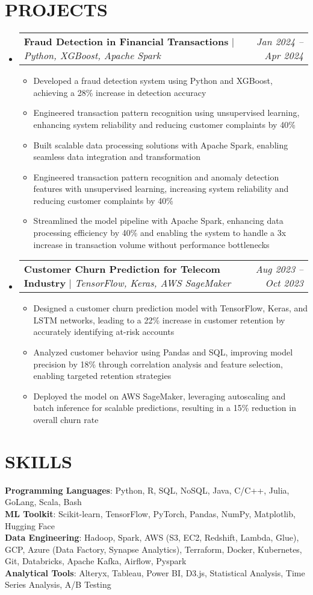 \documentclass[letterpaper,11pt]{article}
\makeatletter
\newcommand{\resumeItem}[1]{
  \item\small{
    {#1 \vspace{-4pt}}
  }
}
\newcommand{\resumeProjectHeading}[2]{
    \item
    \begin{tabular*}{0.97\textwidth}{l@{\extracolsep{\fill}}r}
      \small#1 & #2 \\
    \end{tabular*}\vspace{-7pt}
}
\newcommand{\resumeSubHeadingListStart}{\begin{itemize}[leftmargin=0.15in, label={}]}
\newcommand{\resumeSubHeadingListEnd}{\end{itemize}}
\newcommand{\resumeItemListStart}{\begin{itemize}}
\newcommand{\resumeItemListEnd}{\end{itemize}\vspace{-5pt}}
\makeatother
\begin{document}
\section{\textbf{PROJECTS}}
    \resumeSubHeadingListStart
      \resumeProjectHeading
          {\textbf{Fraud Detection in Financial Transactions} $|$ \emph{Python, XGBoost, Apache Spark}}{\textit{Jan 2024 -- Apr 2024}}
          \resumeItemListStart
            \resumeItem{Developed a fraud detection system using Python and XGBoost, achieving a 28\% increase in detection accuracy} 
            \resumeItem{Engineered transaction pattern recognition using unsupervised learning, enhancing system reliability and reducing customer complaints by 40\%}
            \resumeItem{Built scalable data processing solutions with Apache Spark, enabling seamless data integration and transformation}
            \resumeItem{Engineered transaction pattern recognition and anomaly detection features with unsupervised learning, increasing system reliability and reducing customer complaints by 40\%}
            \resumeItem{Streamlined the model pipeline with Apache Spark, enhancing data processing efficiency by 40\% and enabling the system to handle a 3x increase in transaction volume without performance bottlenecks}
          \resumeItemListEnd
      \resumeProjectHeading
          {\textbf{Customer Churn Prediction for Telecom Industry} $|$ \emph{TensorFlow, Keras, AWS SageMaker}}{\textit{Aug 2023 -- Oct 2023}}
          \resumeItemListStart
            \resumeItem{Designed a customer churn prediction model with TensorFlow, Keras, and LSTM networks, leading to a 22\% increase in customer retention by accurately identifying at-risk accounts}
            \resumeItem{Analyzed customer behavior using Pandas and SQL, improving model precision by 18\% through correlation analysis and feature selection, enabling targeted retention strategies}
            \resumeItem{Deployed the model on AWS SageMaker, leveraging autoscaling and batch inference for scalable predictions, resulting in a 15\% reduction in overall churn rate}
          \resumeItemListEnd
    \resumeSubHeadingListEnd

\section{\textbf{SKILLS}}
 \begin{itemize}[leftmargin=0.15in, label={}]
    \small{\item{
     \textbf{Programming Languages}{: Python, R, SQL, NoSQL, Java, C/C++, Julia, GoLang, Scala, Bash} \\
     \textbf{ML Toolkit}{: Scikit-learn, TensorFlow, PyTorch, Pandas, NumPy, Matplotlib, Hugging Face} \\
     \textbf{Data Engineering}{: Hadoop, Spark, AWS (S3, EC2, Redshift, Lambda, Glue), GCP, Azure (Data Factory, Synapse Analytics), Terraform, Docker, Kubernetes, Git, Databricks, Apache Kafka, Airflow, Pyspark} \\
     \textbf{Analytical Tools}{: Alteryx, Tableau, Power BI, D3.js, Statistical Analysis, Time Series Analysis, A/B Testing}
    }}
 \end{itemize}
\end{document}
